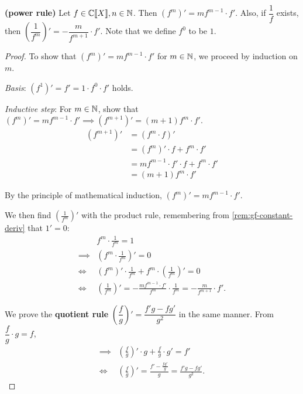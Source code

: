 \documentclass[a4paper, 12pt]{report}
\begin{document}
\begin{lem}\label{lem:gf-power-rule}
\textbf{(power rule)} Let $f \in \mathbb{C}\llbracket X \rrbracket, n \in \mathbb{N}$. Then $(f^m)'  = m f^{m - 1} \cdot f'$. Also, if $\dfrac{1}{f}$ exists, then $\left(\dfrac{1}{f^m}\right)' = -\dfrac{m}{f^{m + 1}} \cdot f'$. Note that we define $f^0$ to be $1$.
\end{lem}
\begin{proof}
To show that $(f^m)' = m f^{m - 1} \cdot f'$ for $m \in \mathbb{N}$, we proceed by induction on $m$.
\begin{description}
\item \textit{Basis}: $(f^1)' = f' = 1 \cdot f^0 \cdot f'$ holds.
\item \textit{Inductive step}: For $m \in \mathbb{N}$, show that $(f^m)' = m f^{m - 1} \cdot f' \implies (f^{m + 1})' = (m + 1) f^m \cdot f'$.
\begin{align*}
    (f^{m + 1})'
    &= (f^m \cdot f)'\\
    &= (f^m)' \cdot f + f^m \cdot f'\\
    &= m f^{m - 1} \cdot f' \cdot f + f^m \cdot f'\\
    &= (m + 1) f^m \cdot f'
\end{align*}
\item By the principle of mathematical induction, $(f^m)' = m f^{m - 1} \cdot f'$.
\end{description}

We then find $(\frac{1}{f^m})'$ with the product rule, remembering from \cref{rem:gf-constant-deriv} that $1' = 0$:
\begin{align*}
    &f^m \cdot \frac{1}{f^m} = 1\\
    \implies &(f^m \cdot \frac{1}{f^m})' = 0\\
    \iff &(f^m)' \cdot \frac{1}{f^m} + f^m \cdot \left(\frac{1}{f^m}\right)' = 0\\
    \iff &\left(\frac{1}{f^m}\right)'= -\frac{m f^{m - 1} \cdot f'}{f^m} \cdot \frac{1}{f^m} = -\frac{m}{f^{m + 1}} \cdot f'.
\end{align*}

We prove the \textbf{quotient rule} $\left(\dfrac{f}{g}\right)' = \dfrac{f' g - f g'}{g^2}$ in the same manner. From $\dfrac{f}{g} \cdot g = f$,
\begin{align*}
    \implies &\left(\frac{f}{g}\right)' \cdot g + \frac{f}{g} \cdot g' = f'\\
    \iff &\left(\frac{f}{g}\right)' = \frac{f' - \frac{f g'}{g}}{g} = \frac{f' g - f g'}{g^2}.
\end{align*}
\end{proof}
\end{document}

